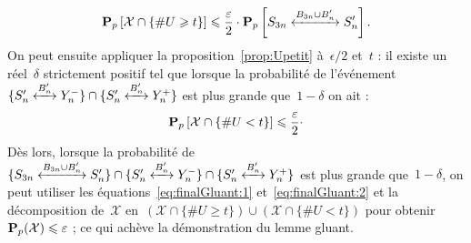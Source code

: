 			\begin{equation}\label{eq:finalGluant:1}
					\Pp{\mathcal{X}\cap\{\#U \geq t\}} 
				\leq 
					\frac{\epsilon}{2}
					\cdot
					\Pp{\relie[B_{3n}\cup B_n']{S_{3n}}{S_n'}}.			
			\end{equation}
			On peut ensuite appliquer la proposition~\ref{prop:Upetit} à~$\epsilon/2$ et~$t$ : il existe un réel~$\delta$ strictement positif tel que lorsque la probabilité de l'événement~$\{\relie[B_n']{S_n'}{Y_n^-}\}\cap\{\relie[B_n']{S_n'}{Y_n^+}\}$ est plus grande que~$1-\delta$ on ait :
			\begin{equation}\label{eq:finalGluant:2}
				\Pp{\mathcal{X}\cap\{\#U < t\}}
				\leq
				\frac{\epsilon}{2}
				\cdot %
			\end{equation}
			Dès lors, lorsque la probabilité de~$\{\relie[B_{3n}\cup B_n']{S_{3n}}{S_n'}\} \cap \{\relie[B_n']{S_n'}{Y_n^-}\} \cap \{\relie[B_n']{S_n'}{Y_n^+}\}$ est plus grande que~$1-\delta$, on peut utiliser les équations~\eqref{eq:finalGluant:1} et~\eqref{eq:finalGluant:2} et la décomposition de~$\mathcal{X}$ en~$(\mathcal{X}\cap\{\# U \geq t\}) \cup (\mathcal{X}\cap \{\# U < t\})$  pour obtenir~$\bm{\mathrm{P}}_{p}(\mathcal{X}) \leqslant \varepsilon$ ; ce qui achève la démonstration du lemme gluant.

